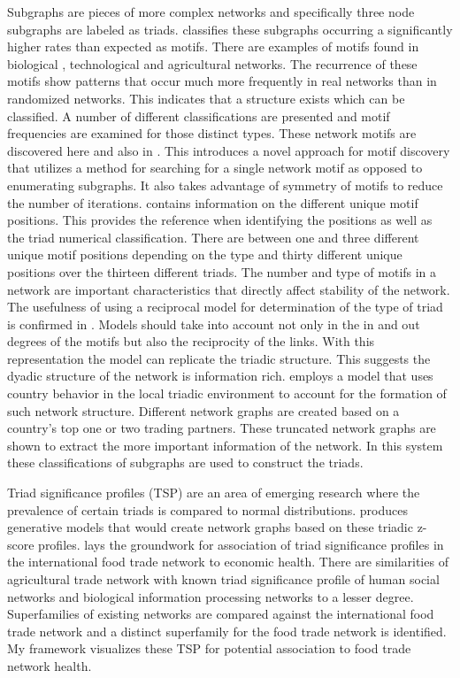 Subgraphs are pieces of more complex networks and specifically three node subgraphs are labeled as triads. \cite{milo2002network} classifies these subgraphs occurring a significantly higher rates than expected as motifs. There are examples of motifs found in biological \citep{shen2002network}, technological \citep{milo2002network} and agricultural \citep{shutters2012agricultural} networks. The recurrence of these motifs show patterns that occur much more frequently in real networks than in randomized networks. This indicates that a structure exists which can be classified. A number of different classifications are presented and motif frequencies are examined for those distinct types. These network motifs are discovered here and also in \cite{grochow2007network}. This introduces a novel approach for motif discovery that utilizes a method for searching for a single network motif as opposed to enumerating subgraphs. It also takes advantage of symmetry of motifs to reduce the number of iterations. \cite{stouffer2012evolutionary} contains information on the different unique motif positions. This provides the reference when identifying the positions as well as the triad numerical classification. There are between one and three different unique motif positions depending on the type and thirty different unique positions over the thirteen different triads. The number and type of motifs in a network are important characteristics that directly affect stability of the network. The usefulness of using a reciprocal model for determination of the type of triad is confirmed in \cite{squartini2012triadic}. Models should take into account not only in the in and out degrees of the motifs but also the reciprocity of the links. With this representation the model can replicate the triadic structure. This suggests the dyadic structure of the network is information rich. \cite{zhou2016structure} employs a model that uses country behavior in the local triadic environment to account for the formation of such network structure. Different network graphs are created based on a country's top one or two trading partners. These truncated network graphs are shown to extract the more important information of the network. In this system these classifications of subgraphs are used to construct the triads.\par
Triad significance profiles (TSP) are an area of emerging research where the prevalence of certain triads is compared to normal distributions. \cite{winkler2013motifs} produces generative models that would create network graphs based on these triadic z-score profiles. \cite{shutters2012agricultural} lays the groundwork for association of triad significance profiles in the international food trade network to economic health. There are similarities of agricultural trade network with known triad significance profile of human social networks and biological information processing networks to a lesser degree. Superfamilies of existing networks are compared against the international food trade network and a distinct superfamily for the food trade network is identified. My framework visualizes these TSP for potential association to food trade network health.\par
